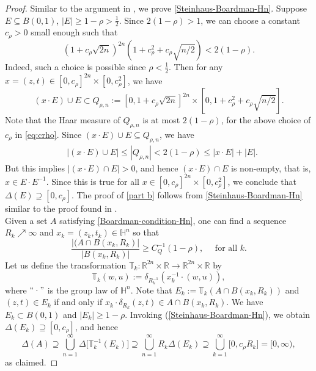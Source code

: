 \documentclass[11pt, reqno]{amsart}
\theoremstyle{plain}
\newcommand{\R}{\ensuremath{\mathbb{R_+}}}
\theoremstyle{remark}
\theoremstyle{example}
\theoremstyle{definition}
\numberwithin{equation}{section}
\def\R{\mathbb{R}}
\def\Ha{\mathbb{H}^n}
\begin{document}
\begin{proof}
Similar to the argument in \cite[Lemma II]{Boardman-1970}, we prove \eqref{Steinhaus-Boardman-Hn}. Suppose $E \subseteq B(0,1)$, $ |E| \geq 1 -\rho > \frac12$. Since $2(1-\rho) > 1$, we can choose a constant $c_{\rho} >0$ small enough such that
\begin{equation}
    (1+c_{\rho}\sqrt{2n})^{2n}   (1+c_{\rho}^2+c_{\rho}\sqrt{n/2})<2(1-\rho).                             \label{eq:crho}
\end{equation}
Indeed, such a choice is possible since $\rho<\frac12$.%
Then for any $x = (z,t) \in [0, c_{\rho}]^{2n}\times [0,c_{\rho}^2]$, we have $$(x\cdot E)\cup E\subset Q_{\rho,n}:= [0,1+c_{\rho}\sqrt{2n}]^{2n}  \times \left[0,1+c_{\rho}^2+c_{\rho}\sqrt{n/2}\right].$$ 
Note that the Haar measure of $Q_{\rho,n}$ is at most $2(1-\rho)$, for the above choice of $c_{\rho}$ in \eqref{eq:crho}. Since $(x\cdot E) \cup E \subseteq Q_{\rho,n}$, we have
\begin{align*} &\bigl|(x \cdot E) \cup E \bigr| \leq |Q_{\rho,n}| < 2(1 - \rho) \leq |x \cdot E| + |E|.     \end{align*}
But this implies $ \bigl| (x \cdot E) \cap E \bigr| > 0$, and hence $(x \cdot E) \cap E$ is non-empty, that is, $x \in E \cdot E^{-1}$.  Since this is true for all $x \in [0, c_{\rho}]^{2n}\times [0,c_{\rho}^2]$, we conclude that $\Delta(E) \supseteq [0, c_{\rho}]$. 
\vskip0.1in
\noindent The proof of \eqref{part b} follows from \eqref{Steinhaus-Boardman-Hn} similar to the proof found in \cite[Section 10.1]{Pramanik-Raani2023}.\\
Given a set $A$ satisfying \eqref{Boardman-condition-Hn}, one can find a sequence $R_k \nearrow \infty$ and $x_k=(z_k,t_k) \in \mathbb H^n$ so that 
\begin{equation}
\frac{|(A \cap B(x_k,R_k)|}{|B(x_k,R_k)|} \geq  C_Q^{-1}(1 - \rho) ,  \quad \text{ for all $k$.} \label{eqdeduc}
\end{equation}
Let us define the transformation $\mathbb T_k: \R^{2n} \times \R \rightarrow \R^{2n} \times \R$ by \[ \mathbb T_k(w,u) := \delta_{R_k^{-1}}\left( x_k^{-1} \cdot (w,u)\right), \]  
where $``\cdot"$ is the group law of $\Ha$. 
Note that $E_k := \mathbb T_k(A \cap B(x_k,R_k))$ and $(z,t)\in E_k$ if and only if $x_{k} \cdot \delta_{R_k}(z,t)\in A\cap B(x_k, R_k)$. We have $E_k\subset B(0,1)$ and $|E_k| \geq 1 -\rho$. Invoking (\ref{Steinhaus-Boardman-Hn}), we obtain $ \Delta(E_k) \supseteq [0, c_{\rho}]$, and hence
\[ \Delta(A) \supseteq \bigcup_{n=1}^{\infty} \Delta \bigl[\mathbb T_k^{-1}(E_k) \bigr] \supseteq \bigcup_{n=1}^{\infty} R_k \Delta(E_k)  \supseteq \bigcup_{k=1}^{\infty} \bigl[0, c_{\rho} R_k\bigr] = [0, \infty), \] 
as claimed. 
\end{proof} 
\end{document}
